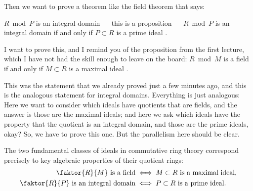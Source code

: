 \begin{speech}[00:53:20 - 00:54:40]
Then we want to prove a theorem like the field theorem that says: 

$R \bmod P$ is an integral domain --- this is a proposition --- $R \bmod P$ is an integral domain if and only if $P \subset R$ is a prime ideal .

I want to prove this, and I remind you of the proposition from the first lecture, which I have not had the skill enough to leave on the board: $R \bmod M$ is a field if and only if $M \subset R$ is a maximal ideal .

This was the statement that we already proved just a few minutes ago, and this is the analogous statement for integral domains. Everything is just analogous: Here we want to consider which ideals have quotients that are fields, and the answer is those are the maximal ideals; and here we ask which ideals have the property that the quotient is an integral domain, and those are the prime ideals, okay? So, we have to prove this one. But the parallelism here should be clear.
\end{speech}

\begin{content}
\end{content}

\begin{overview}
The two fundamental classes of ideals in commutative ring theory correspond precisely to key algebraic properties of their quotient rings:
\begin{align*}
\faktor{R}{M} \text{ is a field} &\iff M \subset R \text{ is a maximal ideal}, \\
\faktor{R}{P} \text{ is an integral domain} &\iff P \subset R \text{ is a prime ideal}.
\end{align*}
\end{overview}

